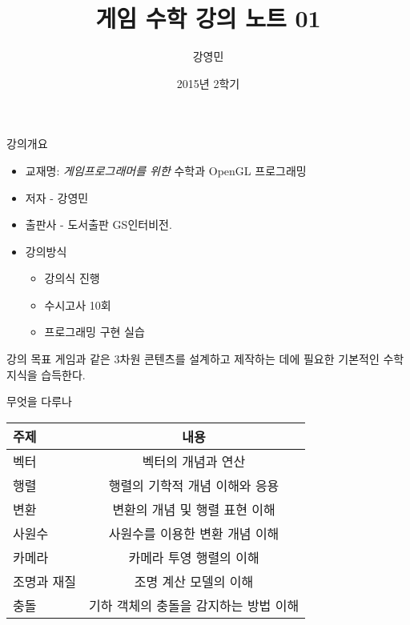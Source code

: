 \documentclass{beamer}
\title[게임수학 강의 소개]{ 게임 수학 강의 노트 01}
\author{강영민}
\institute{동명대학교}
\date{2015년 2학기}
\begin{document}
\begin{frame}
  \titlepage
\end{frame}



\begin{frame}{강의개요}
\begin{itemize}
  \item 교재명: {\small \it 게임프로그래머를 위한} 수학과 OpenGL 프로그래밍
  \item 저자 - 강영민
  \item 출판사 -  도서출판 GS인터비전.
  \item 강의방식
    \begin{itemize}
      \item 강의식 진행
      \item 수시고사 10회
      \item 프로그래밍 구현 실습
    \end{itemize} 
\end{itemize}

\begin{block}{강의 목표}
게임과 같은 3차원 콘텐츠를 설계하고 제작하는 데에 필요한 기본적인 수학 지식을 습득한다.
\end{block}

\end{frame}


\begin{frame}{무엇을 다루나}


\begin{table}
\centering
\begin{tabular}{l|c}  \hline
주제 & 내용 \\\hline  \hline
벡터 & 벡터의 개념과 연산 \\ \hline
행렬 & 행렬의 기학적 개념 이해와 응용 \\ \hline
변환 & 변환의 개념 및 행렬 표현 이해 \\ \hline
사원수 & 사원수를 이용한 변환 개념 이해 \\ \hline
카메라 & 카메라 투영 행렬의 이해 \\ \hline
조명과 재질 & 조명 계산 모델의 이해 \\ \hline
충돌 & 기하 객체의 충돌을 감지하는 방법 이해 \\ \hline
\end{tabular}
\end{table}

\end{frame}
\end{document}
